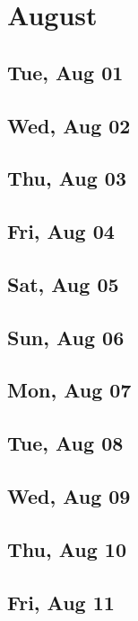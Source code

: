 \chapter{August}
	\section{Tue, Aug 01}
		
	\section{Wed, Aug 02}
		
	\section{Thu, Aug 03}
		
	\section{Fri, Aug 04}
		
	\section{Sat, Aug 05}
		
	\section{Sun, Aug 06}
		
	\section{Mon, Aug 07}
		
	\section{Tue, Aug 08}
		
	\section{Wed, Aug 09}
		
	\section{Thu, Aug 10}
		
	\section{Fri, Aug 11}
		
